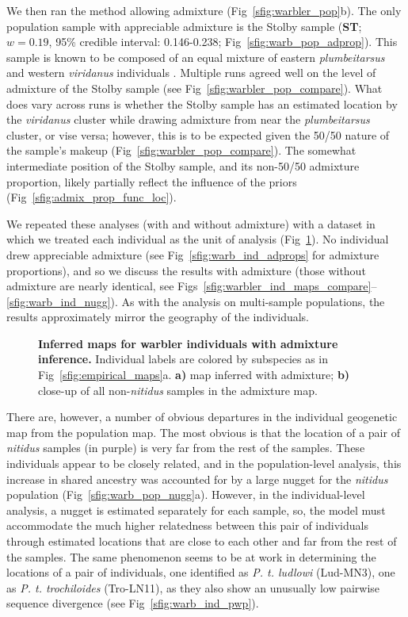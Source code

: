 \documentclass[10pt,letterpaper]{article}
\begin{document}
We then ran the method allowing admixture (Fig\ \ref{sfig:warbler_pop}b). The only population sample with appreciable admixture is the Stolby sample (\textbf{ST}; $w=0.19$, 95\% credible interval: 0.146-0.238; Fig\ \ref{sfig:warb_pop_adprop}).  This sample is known to be composed of an equal mixture of eastern \textit{plumbeitarsus} and western \textit{viridanus} individuals \cite{alcaide2014genomic}. Multiple runs agreed well on the level of admixture of the Stolby sample (see Fig\ \ref{sfig:warbler_pop_compare}). What does vary across runs is whether the Stolby sample has an estimated location by the \textit{viridanus} cluster while drawing admixture from near the \textit{plumbeitarsus} cluster, or vise versa; however, this is to be expected given the 50/50 nature of the sample's makeup (Fig\ \ref{sfig:warbler_pop_compare}). The somewhat intermediate position of the Stolby sample, and its non-50/50 admixture proportion, likely partially reflect the influence of the priors (Fig\ \ref{sfig:admix_prop_func_loc}). 

We repeated these analyses (with and without admixture) with a dataset 
in which we treated each individual as the unit of analysis 
(Fig\ \ref{sfig:warbler_ind_maps}).  
No individual drew appreciable admixture (see Fig\ \ref{sfig:warb_ind_adprops} for admixture proportions), and so we discuss the results with admixture (those without admixture are nearly identical, see Figs\ \ref{sfig:warbler_ind_maps_compare}--\ref{sfig:warb_ind_nugg}).  As with the analysis on multi-sample populations, the results approximately mirror the geography of the individuals.
%
\begin{figure}[ht!]
\begin{center}
\end{center}
\caption{
\textbf{Inferred maps for warbler individuals with admixture inference.}
Individual labels are colored by subspecies as in Fig\ \ref{sfig:empirical_maps}a.   
	\textbf{a)}
	map inferred with admixture; 
	\textbf{b)} close-up of all non-\textit{nitidus} samples in the admixture map.
}\label{sfig:warbler_ind_maps}
\end{figure}

There are, however, a number of obvious departures in the individual geogenetic map from the population map.  The most obvious is that the location of a pair of \textit{nitidus} samples (in purple) is very far from the rest of the samples.  
These individuals appear to be closely related, and
in the population-level analysis,
this increase in shared ancestry was accounted for by a large nugget for the \textit{nitidus} population 
(Fig\ \ref{sfig:warb_pop_nugg}a).
However, in the individual-level analysis, a nugget is estimated separately for each sample, 
so, the model must accommodate the much higher relatedness between this pair of individuals
through estimated locations that are close to each other and far from the rest of the samples.
The same phenomenon seems to be at work in determining the locations of a pair of individuals, one identified as \textit{P. t. ludlowi} (Lud-MN3), one as \textit{P. t. trochiloides} (Tro-LN11), 
as they also show an unusually low pairwise sequence divergence (see Fig\ \ref{sfig:warb_ind_pwp}).
\end{document}
